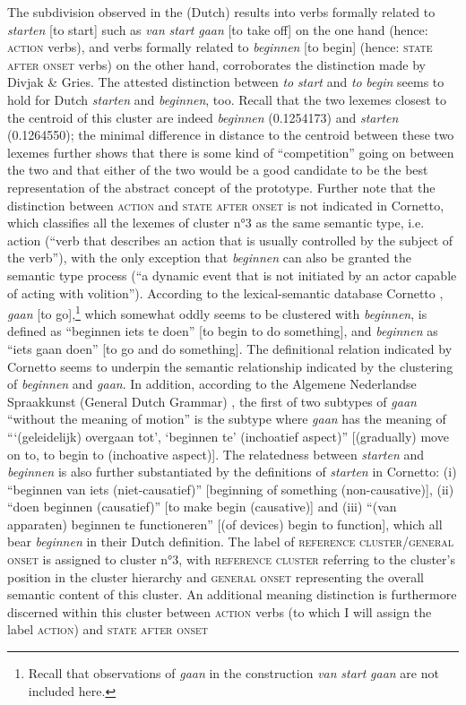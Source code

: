The subdivision observed in the (Dutch) results into verbs formally related to \textit{starten} [to start] such as \textit{van} \textit{start} \textit{gaan} [to take off] on the one hand (hence: \textsc{action} verbs), and verbs formally related to \textit{beginnen} [to begin] (hence: \textsc{state after onset} verbs) on the other hand, corroborates the distinction made by Divjak \& Gries. The attested distinction between \textit{to} \textit{start} and \textit{to} \textit{begin} seems to hold for Dutch \textit{starten} and \textit{beginnen}, too. Recall that the two lexemes closest to the centroid of this cluster are indeed \textit{beginnen} (0.1254173) and \textit{starten} (0.1264550); the minimal difference in distance to the centroid between these two lexemes further shows that there is some kind of ``competition'' going on between the two and that either of the two would be a good candidate to be the best representation of the abstract concept of the prototype. Further note that the distinction between \textsc{action} and \textsc{state after onset} is not indicated in Cornetto, which classifies all the lexemes of cluster n°3 as the same semantic type, i.e. action (“verb that describes an action that is usually controlled by the subject of the verb”), with the only exception that \textit{beginnen} can also be granted the semantic type process (“a dynamic event that is not initiated by an actor capable of acting with volition”). According to the lexical-semantic database Cornetto \citep{vossen_cornetto_2008}, \textit{gaan} [to go],\footnote{Recall that observations of \textit{gaan} in the construction \textit{van} \textit{start} \textit{gaan} are not included here.} which somewhat oddly seems to be clustered with \textit{beginnen}, is defined as “beginnen iets te doen” [to begin to do something], and \textit{beginnen} as “iets gaan doen” [to go and do something]. The definitional relation indicated by Cornetto seems to underpin the semantic relationship indicated by the clustering of \textit{beginnen} and \textit{gaan}. In addition, according to the Algemene Nederlandse Spraakkunst (General Dutch Grammar) \citep{haeseryn_algemene_2012}, the first of two subtypes of \textit{gaan} “without the meaning of motion” is the subtype where \textit{gaan} has the meaning of “‘(geleidelijk) overgaan tot’, ‘beginnen te’ (inchoatief aspect)” [(gradually) move on to, to begin to (inchoative aspect)]. The relatedness between \textit{starten} and \textit{beginnen} is also further substantiated by the definitions of \textit{starten} in Cornetto: (i) “beginnen van iets (niet-causatief)” [beginning of something (non-causative)], (ii) “doen beginnen (causatief)” [to make begin (causative)] and (iii) “(van apparaten) beginnen te functioneren” [(of devices) begin to function], which all bear \textit{beginnen} in their Dutch definition. The label of \textsc{reference cluster}\slash \textsc{general onset} is assigned to cluster n°3, with \textsc{reference cluster} referring to the cluster’s position in the cluster hierarchy and \textsc{general onset} representing the overall semantic content of this cluster. An additional meaning distinction is furthermore discerned within this cluster between \textsc{action} verbs (to which I will assign the label \textsc{action}) and \textsc{state after onset} 